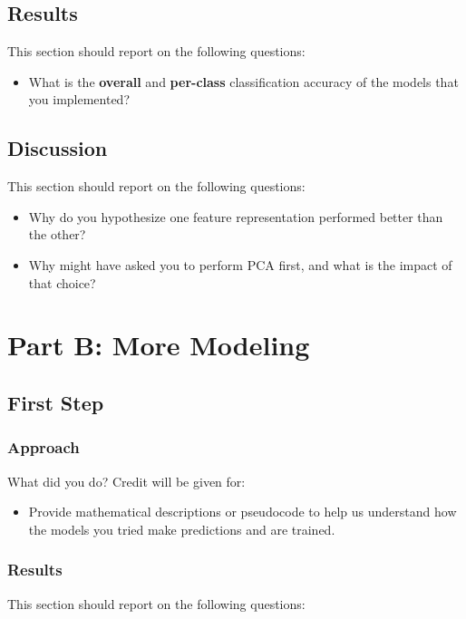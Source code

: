 \documentclass[11pt]{article}
\begin{document}
\subsection{Results}

This section should report on the following questions: 

\begin{itemize}
\item  What is the \textbf{overall} and \textbf{per-class} classification accuracy of the models that you implemented?
\end{itemize}

\subsection{Discussion}

This section should report on the following questions: 

\begin{itemize}
  \item Why do you hypothesize one feature representation performed better than the other?  
  \item Why might have asked you to perform PCA first, and what is the impact of that choice?
  \end{itemize}

\section{Part B: More Modeling}

\subsection{First Step}

\subsubsection{Approach}

What did you do? Credit will be given for:

  \begin{itemize}
  \item Provide mathematical descriptions or pseudocode to help us understand how the models you tried make predictions and are trained.
  \end{itemize}

\subsubsection{Results}
This section should report on the following questions: 
\end{document}
